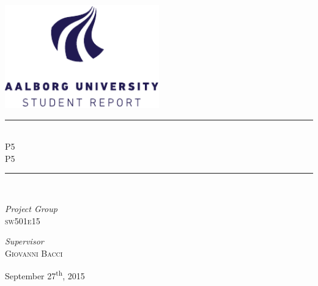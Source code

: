 \begin{titlepage}
\begin{center}
\newcommand{\HRule}{\rule{\linewidth}{0.5mm}}

\includegraphics[width=0.5\textwidth]{aau_logo_en.pdf}~\\[1cm]



\HRule \\[0.4cm]
{ \huge P5\\[0.4cm]
  \large \textsc{P5}}

\HRule \\[1.5cm]

\begin{minipage}{0.4\textwidth}
\begin{flushleft} \large
\emph{Project Group}\\
\textsc{sw501e15}
\end{flushleft}
\end{minipage}
\begin{minipage}{0.4\textwidth}
\begin{flushright} \large
\emph{Supervisor} \\
\textsc{Giovanni Bacci}
\end{flushright}
\end{minipage}

\vfill

{\large September 27\textsuperscript{th}, 2015}

\end{center}
\end{titlepage}
